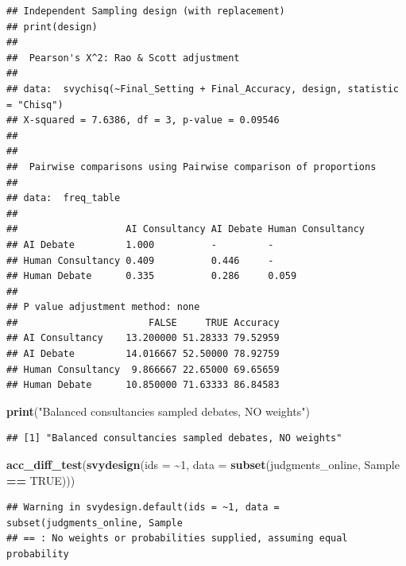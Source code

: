 \documentclass[
]{article}
\newenvironment{Shaded}{\begin{snugshade}}{\end{snugshade}}
\newcommand{\AttributeTok}[1]{\textcolor[rgb]{0.13,0.29,0.53}{#1}}
\newcommand{\ConstantTok}[1]{\textcolor[rgb]{0.56,0.35,0.01}{#1}}
\newcommand{\DecValTok}[1]{\textcolor[rgb]{0.00,0.00,0.81}{#1}}
\newcommand{\FunctionTok}[1]{\textcolor[rgb]{0.13,0.29,0.53}{\textbf{#1}}}
\newcommand{\NormalTok}[1]{#1}
\newcommand{\SpecialCharTok}[1]{\textcolor[rgb]{0.81,0.36,0.00}{\textbf{#1}}}
\newcommand{\StringTok}[1]{\textcolor[rgb]{0.31,0.60,0.02}{#1}}
\begin{document}
\begin{verbatim}
## Independent Sampling design (with replacement)
## print(design)
## 
##  Pearson's X^2: Rao & Scott adjustment
## 
## data:  svychisq(~Final_Setting + Final_Accuracy, design, statistic = "Chisq")
## X-squared = 7.6386, df = 3, p-value = 0.09546
## 
## 
##  Pairwise comparisons using Pairwise comparison of proportions 
## 
## data:  freq_table 
## 
##                   AI Consultancy AI Debate Human Consultancy
## AI Debate         1.000          -         -                
## Human Consultancy 0.409          0.446     -                
## Human Debate      0.335          0.286     0.059            
## 
## P value adjustment method: none 
##                       FALSE     TRUE Accuracy
## AI Consultancy    13.200000 51.28333 79.52959
## AI Debate         14.016667 52.50000 78.92759
## Human Consultancy  9.866667 22.65000 69.65659
## Human Debate      10.850000 71.63333 86.84583
\end{verbatim}

\begin{Shaded}
\begin{Highlighting}[]
\FunctionTok{print}\NormalTok{(}\StringTok{"Balanced consultancies sampled debates, NO weights"}\NormalTok{)}
\end{Highlighting}
\end{Shaded}

\begin{verbatim}
## [1] "Balanced consultancies sampled debates, NO weights"
\end{verbatim}

\begin{Shaded}
\begin{Highlighting}[]
\FunctionTok{acc\_diff\_test}\NormalTok{(}\FunctionTok{svydesign}\NormalTok{(}\AttributeTok{ids =} \SpecialCharTok{\textasciitilde{}}\DecValTok{1}\NormalTok{, }\AttributeTok{data =} \FunctionTok{subset}\NormalTok{(judgments\_online, }\StringTok{\textasciigrave{}}\AttributeTok{Sample}\StringTok{\textasciigrave{}} \SpecialCharTok{==} \ConstantTok{TRUE}\NormalTok{)))}
\end{Highlighting}
\end{Shaded}

\begin{verbatim}
## Warning in svydesign.default(ids = ~1, data = subset(judgments_online, Sample
## == : No weights or probabilities supplied, assuming equal probability
\end{verbatim}
\end{document}
